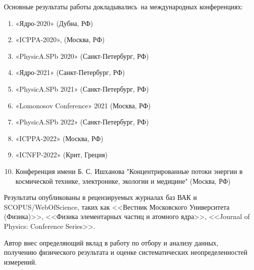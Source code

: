 {\probation}
Основные результаты работы докладывались~на международных конференциях:
\begin{enumerate}[beginpenalty=10000] %
	\item «Ядро-2020» (Дубна, РФ)
	\item «ICPPA-2020», (Москва, РФ)	
	\item «PhysicA.SPb 2020» (Санкт-Петербург, РФ)
	\item «Ядро-2021» (Санкт-Петербург, РФ)
	\item «PhysicA.SPb 2021» (Санкт-Петербург, РФ)
	\item «Lomonosov Conference» 2021 (Москва, РФ)
	\item «PhysicA.SPb 2022» (Санкт-Петербург, РФ)
	\item «ICPPA-2022» (Москва, РФ)
	\item «ICNFP-2022» (Крит, Греция)
	\item Конференция имени Б. С. Ишханова "Концентрированные потоки энергии в космической технике, электронике, экологии и медицине" (Москва, РФ)
\end{enumerate}
Результаты опубликованы в рецензируемых журналах баз ВАК и SCOPUS/WebOfScience, таких как <<Вестник Московского Университета (Физика)>>, <<Физика элементарных частиц и атомного ядра>>, <<Journal of Physics: Conference Series>>.	

{\contribution} Автор внес определяющий вклад в работу по отбору и анализу данных, получению физического результата и оценке систематических неопределенностей измерений.

